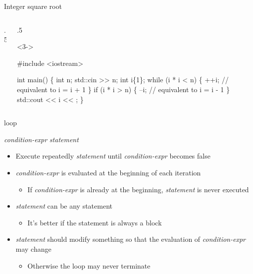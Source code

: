 \begin{frame}[fragile]{Integer square root}
\begin{columns}[T]
\begin{column}{.5\textwidth}
    \end{column}

    \begin{column}{.5\textwidth}
      \begin{codeblock}<3->{
#include <iostream>

int main()
\{
  int n;
  std::cin >> n;
  int i\{1\};
  while (i * i < n) \{
    ++i;   // equivalent to i = i + 1
  \}
  if (i * i > n) \{
    --i;   // equivalent to i = i - 1
  \}
  std::cout <{}< i <{}< \bslashn;
\}}\end{codeblock}
    \end{column}

  \end{columns}

\end{frame}

\begin{frame}[fragile]{ loop}

  \begin{center}
     \textit{condition-expr} \code{)} \textit{statement}
  \end{center}

  \pause

  \begin{itemize}[<+->]
  \item Execute repeatedly \textit{statement} until \textit{condition-expr}
    becomes false
  \item \textit{condition-expr} is evaluated at the beginning of each iteration
    \begin{itemize}
    \item If \textit{condition-expr} is already  at the beginning,
      \textit{statement} is never executed
    \end{itemize}
  \item \textit{statement} can be any statement
    \begin{itemize}
    \item It's better if the statement is always a block
    \end{itemize}
  \item \textit{statement} should modify something so that the evaluation of
    \textit{condition-expr} may change
    \begin{itemize}[<.->]
    \item Otherwise the loop may never terminate
    \end{itemize}
  \end{itemize}

\end{frame}

